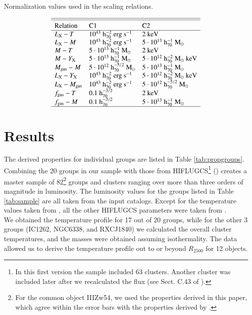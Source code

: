 \documentclass{aa} %
\begin{document}
\begin{table}[!tp]
\caption{Normalization values used in the scaling relations.}
$$
\centering
\begin{array}{lll}
\hline\hline
\noalign{\smallskip}
{\rm Relation} &  {\rm C1} & {\rm C2}   \\
\hline
L_{\text{X}}-T & {\rm 10^{43} \ h_{70}^{-2} \ erg \ s^{-1}} & {\rm 2 \ keV} \\ 
L_{\text{X}}-M & {\rm 10^{43} \ h_{70}^{-2} \ erg \ s^{-1}} & {\rm 5\cdot 10^{13} \ h_{70}^{-1} \ M_{\odot}} \\ 
M-T  	 & {\rm 5\cdot 10^{13}  \ h_{70}^{-1} \ M_{\odot}} & {\rm 2 \ keV} \\ 
M-Y_{\text{X}} & {\rm 5\cdot 10^{13}  \ h_{70}^{-1} \ M_{\odot}} & {\rm 5\cdot 10^{12}  \ h_{70}^{-2} \ M_{\odot} \ keV} \\ 
M_{\text{gas}}-M & {\rm 5\cdot 10^{12} \ h_{70}^{-5/2} \ M_{\odot}} &  {\rm 5\cdot 10^{13}  \ h_{70}^{-1} \ M_{\odot}}  \\ 
L_{\text{X}}-Y_{\text{X}} & {\rm 10^{43} \ h_{70}^{-2} \ erg \ s^{-1}} & {\rm 5\cdot 10^{12}  \ h_{70}^{-2} \ M_{\odot} \ keV}   \\
L_{\text{X}}-M_{\text{gas}} & {\rm 10^{43} \ h_{70}^{-2} \ erg \ s^{-1}} & {\rm 5\cdot 10^{12} \ h_{70}^{-5/2} \ M_{\odot}} \\  
f_{\text{gas}}-T & {\rm 0.1  \ h_{70}^{-3/2} } & {\rm 2 \ keV} \\ 
f_{\text{gas}}-M & {\rm 0.1  \ h_{70}^{-3/2} } & {\rm 5\cdot 10^{13} \ h_{70}^{-1} \ M_{\odot}} \\ 
\hline
\end{array}
\label{tab:constrel}
$$
\end{table}


\section{Results}  \label{sec_results}

The derived properties for individual groups are listed in Table
\ref{tab:propgroups}. Combining the 20 groups in our sample with
those from HIFLUGCS\footnote{In this first version the sample included 63
  clusters. Another cluster was included later after we recalculated 
  the flux (see Sect. C.43 of \citealt{2010A&A...513A..37H}).}  (\citealt{2002ApJ...567..716R}) creates a master sample
of 82\footnote{For the common object IIIZw54, we used the properties
  derived in this paper, which agree within the error bars with
  the properties derived by \cite{2002ApJ...567..716R}.} groups and clusters
ranging over more than three orders of magnitude in luminosity. The
luminosity values for the groups listed in Table \ref{tab:sample} are
all taken from the input catalogs. Except for the temperature values
taken from \citet{2010A&A...513A..37H}, all the
other HIFLUGCS parameters were taken from \citet{2002ApJ...567..716R}. \\
We obtained the temperature profile for 17 out of 20 groups, while for
the other 3 groups (IC1262, NGC6338, and RXCJ1840) we calculated the
overall cluster temperatures, and the masses were obtained assuming
isothermality. The data allowed us to derive the temperature profile
out to or beyond $R_{2500}$ for 12 objects.
\end{document}

